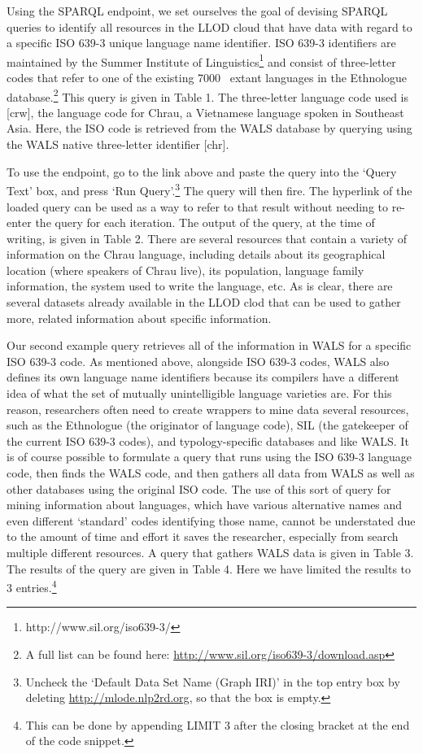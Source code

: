 Using the SPARQL endpoint, we set ourselves the goal of devising SPARQL queries to identify all resources in the LLOD cloud that have data with regard to a specific ISO 639-3 unique language name identifier. ISO 639-3 identifiers are maintained by the Summer Institute of Linguistics\footnote{http://www.sil.org/iso639-3/} and consist of three-letter codes that refer to one of the existing 7000~ extant languages in the Ethnologue  database.\footnote{A full list can be found here: \url{http://www.sil.org/iso639-3/download.asp}} This query is given in Table 1. The three-letter language code used is [crw], the language code for Chrau, a Vietnamese language spoken in Southeast Asia. Here, the ISO code is retrieved from the WALS database by querying using the WALS native three-letter identifier [chr]. 

To use the endpoint, go to the link above and paste the query into the `Query Text' box, and press `Run Query'.\footnote{Uncheck the `Default Data Set Name (Graph IRI)' in the top entry box by deleting \url{http://mlode.nlp2rd.org}, so that the box is empty.} The query will then fire. The hyperlink of the loaded query can be used as a way to refer to that result without needing to re-enter the query for each iteration. The output of the query, at the time of writing, is given in Table 2. There are several resources that contain a variety of information on the Chrau language, including details about its geographical location (where speakers of Chrau live), its population, language family information, the system used to write the language, etc. As is clear, there are several datasets already available in the LLOD clod that can be used to gather more, related information about specific information.

Our second example query retrieves all of the information in WALS for a specific ISO 639-3 code. As mentioned above, alongside ISO 639-3 codes, WALS also defines its own language name identifiers because its compilers have a different idea of what the set of mutually unintelligible language varieties are. For this reason, researchers often need to create wrappers to mine data several resources, such as the Ethnologue (the originator of language code), SIL (the gatekeeper of the current ISO 639-3 codes), and typology-specific databases and like WALS. It is of course possible to formulate a query that runs using the ISO 639-3 language code, then finds the WALS code, and then gathers all data from WALS as well as other databases using the original ISO code. The use of this sort of query for mining information about languages, which have various alternative names and even different `standard' codes identifying those name, cannot be understated due to the amount of time and effort it saves the researcher, especially from search multiple different resources. A query that gathers WALS data is given in Table 3. The results of the query are given in Table 4. Here we have limited the results to 3 entries.\footnote{This can be done by appending LIMIT 3 after the closing bracket at the end of the code snippet.}

